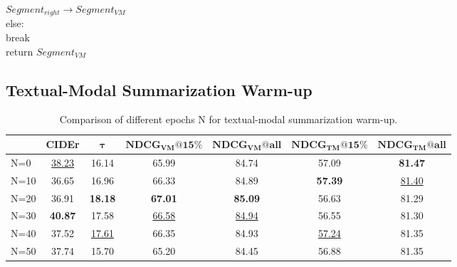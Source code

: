 \begin{algorithm*}
{{{{                    $Segment_{right}\rightarrow Segment_{VM}$\\
                }
            \Indm
            else:\\
            \Indm
        }
        \Indm
        break\\
    }
    \Indm
}
\Indm
return $Segment_{VM}$
\label{algorithm: VM extraction}
\end{algorithm*}

\subsection{Textual-Modal Summarization Warm-up}
\label{sec: warm up}

\begin{table*}[b]
\begin{tabular}{lcccccc}

\toprule
     & \textbf{CIDEr}          & $\boldsymbol{\tau}$         & $\mathbf{NDCG_{VM}@15\%}$ & $\mathbf{NDCG_{VM}@all}$ & $\mathbf{NDCG_{TM}@15\%}$ & $\mathbf{NDCG_{TM}@all}$ \\
\midrule
N=0  & \underline{38.23}    & 16.14          & 65.99           & 84.74          & 57.09           & \textbf{81.47} \\
N=10 & 36.65          & 16.96          & 66.33           & 84.89          & \textbf{57.39}  & \underline{81.40}    \\
N=20 & 36.91          & \textbf{18.18} & \textbf{67.01}  & \textbf{85.09} & 56.63           & 81.29          \\
N=30 & \textbf{40.87} & 17.58          & \underline{66.58}     & \underline{84.94}    & 56.55           & 81.30          \\
N=40 & 37.52          & \underline{17.61}    & 66.35           & 84.93          & \underline{57.24}     & 81.35          \\
N=50 & 37.74          & 15.70          & 65.20           & 84.45          & 56.88           & 81.35  \\       
\bottomrule
\end{tabular}
\caption{ Comparison of different epochs N for textual-modal summarization warm-up.
}
\label{tab: warm up}
\end{table*}

